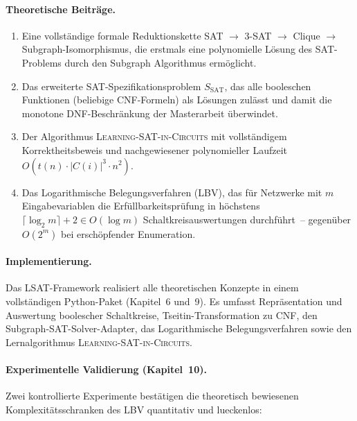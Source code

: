 ﻿\documentclass[a4paper,12pt]{article}
\theoremstyle{definition}
\begin{document}
\paragraph{Theoretische Beiträge.}
\begin{enumerate}
	\item\label{res:reduktion}
	  Eine vollständige formale Reduktionskette
	  SAT $\to$ 3-SAT $\to$ Clique $\to$ Subgraph-Isomorphismus, die erstmals eine
	  polynomielle Lösung des SAT-Problems durch den Subgraph Algorithmus \cite{Epp26,
	  Epp26} ermöglicht.

	\item\label{res:problem}
	  Das erweiterte SAT-Spezifikationsproblem $S_{\text{SAT}}$, das alle booleschen
	  Funktionen (beliebige CNF-Formeln) als Lösungen zulässt und damit die monotone
	  DNF-Beschränkung der Masterarbeit \cite{Epp13} überwindet.

	\item\label{res:algorithmus}
	  Der Algorithmus \textsc{Learning-SAT-in-Circuits} mit vollständigem Korrektheitsbeweis
	  und nachgewiesener polynomieller Laufzeit $O(t(n) \cdot |C(i)|^3 \cdot n^2)$.

	\item\label{res:lbv}
	  Das Logarithmische Belegungsverfahren (LBV), das für Netzwerke mit $m$
	  Eingabevariablen die Erfüllbarkeitsprüfung in höchstens
	  $\lceil\log_2 m\rceil + 2 \in O(\log m)$ Schaltkreisauswertungen durchführt~--
	  gegenüber $O(2^m)$ bei erschöpfender Enumeration.
\end{enumerate}

\paragraph{Implementierung.}
Das LSAT-Framework realisiert alle theoretischen Konzepte in einem vollständigen
Python-Paket (Kapitel~6 und~9).  Es umfasst Repräsentation und Auswertung boolescher
Schaltkreise, Tseitin-Transformation zu CNF, den Subgraph-SAT-Solver-Adapter,
das Logarithmische Belegungsverfahren sowie den Lernalgorithmus \textsc{Learning-SAT-in-Circuits}.

\paragraph{Experimentelle Validierung (Kapitel~10).}
Zwei kontrollierte Experimente bestätigen die theoretisch bewiesenen Komplexitätsschranken
 des LBV quantitativ und lueckenlos:
\end{document}
